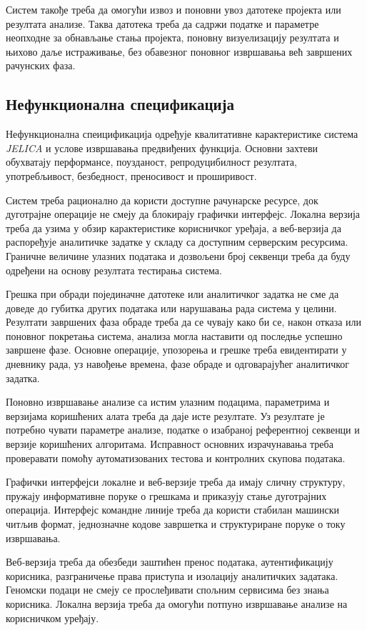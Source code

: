 \documentclass[12pt,oneside]{memoir}
\begin{document}
Систем такође треба да омогући извоз и поновни увоз датотеке пројекта или резултата анализе. Таква датотека треба да садржи податке и параметре неопходне за обнављање стања пројекта, поновну визуелизацију резултата и њихово даље истраживање, без обавезног поновног извршавања већ завршених рачунских фаза.


\subsection{Нефункционална спецификација}
Нефункционална спеицификација одређује квалитативне карактеристике система \textit{JELICA} и услове извршавања предвиђених функција. Основни захтеви обухватају перформансе, поузданост, репродуцибилност резултата, употребљивост, безбедност, преносивост и проширивост.

Систем треба рационално да користи доступне рачунарске ресурсе, док дуготрајне операције не смеју да блокирају графички интерфејс. Локална верзија треба да узима у обзир карактеристике корисничког уређаја, а веб-верзија да распоређује аналитичке задатке у складу са доступним серверским ресурсима. Граничне величине улазних података и дозвољени број секвенци треба да буду одређени на основу резултата тестирања система.

Грешка при обради појединачне датотеке или аналитичког задатка не сме да доведе до губитка других података или нарушавања рада система у целини. Резултати завршених фаза обраде треба да се чувају како би се, након отказа или поновног покретања система, анализа могла наставити од последње успешно завршене фазе. Основне операције, упозорења и грешке треба евидентирати у дневнику рада, уз навођење времена, фазе обраде и одговарајућег аналитичког задатка.

Поновно извршавање анализе са истим улазним подацима, параметрима и верзијама коришћених алата треба да даје исте резултате. Уз резултате је потребно чувати параметре анализе, податке о изабраној референтној секвенци и верзије коришћених алгоритама. Исправност основних израчунавања треба проверавати помоћу аутоматизованих тестова и контролних скупова података.

Графички интерфејси локалне и веб-верзије треба да имају сличну структуру, пружају информативне поруке о грешкама и приказују стање дуготрајних операција. Интерфејс командне линије треба да користи стабилан машински читљив формат, једнозначне кодове завршетка и структуриране поруке о току извршавања.

Веб-верзија треба да обезбеди заштићен пренос података, аутентификацију корисника, разграничење права приступа и изолацију аналитичких задатака. Геномски подаци не смеју се прослеђивати спољним сервисима без знања корисника. Локална верзија треба да омогући потпуно извршавање анализе на корисничком уређају.
\end{document}
